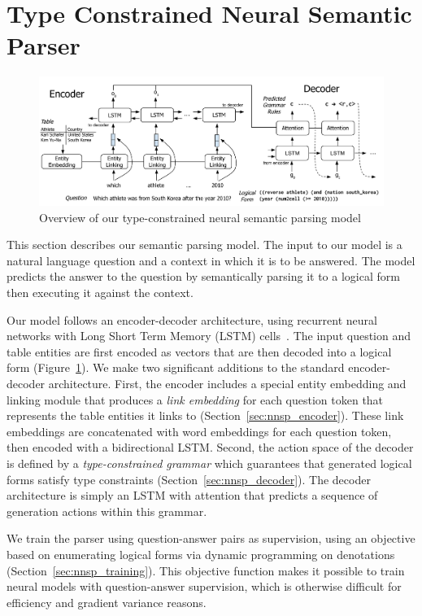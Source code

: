 \section{Type Constrained Neural Semantic Parser}
\begin{figure}
\centering
\includegraphics[width=6in]{figures/type_constrained_nnsp.png}
\caption{Overview of our type-constrained neural semantic parsing model}
\label{fig:nnsp_model}
\end{figure}

This section describes our semantic parsing model.
The input to our model is a natural language question and a context in which it 
is to be answered.
The model predicts the answer to the question by semantically parsing it to a 
logical form then executing it against the context.

Our model follows an encoder-decoder architecture, using recurrent neural 
networks with Long Short Term Memory (LSTM) cells~\citep{hochreiter1997long}. 
The input question and table entities are first encoded as vectors that are 
then decoded into a logical form (Figure~\ref{fig:nnsp_model}).
We make two significant additions to the standard encoder-decoder architecture.
First, the encoder includes a special entity embedding and linking module that 
produces a \emph{link embedding} for each question token that represents the 
table entities it links to (Section~\ref{sec:nnsp_encoder}).
These link embeddings are concatenated with word embeddings for each question 
token, then encoded with a bidirectional LSTM\@.
Second, the action space of the decoder is defined by a \emph{type-constrained 
grammar} which guarantees that generated logical forms satisfy type constraints 
(Section~\ref{sec:nnsp_decoder}).
The decoder architecture is simply an LSTM with attention that predicts a 
sequence of generation actions within this grammar.

We train the parser using question-answer pairs as supervision, using an 
objective based on enumerating logical forms via dynamic programming on 
denotations \citep{pasupat2016inferring} (Section~\ref{sec:nnsp_training}). This 
objective function makes it possible to train neural models with 
question-answer supervision, which is otherwise difficult for efficiency and 
gradient variance reasons.

